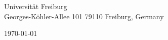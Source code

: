 \begin{minipage}{0.49\textwidth}
\begin{flushleft}
\noindent 
Universität Freiburg\\
Georges-Köhler-Allee 101
79110 Freiburg, Germany
\end{flushleft}
\end{minipage}
\begin{minipage}{0.47\textwidth}
\begin{flushright}
\today
\end{flushright}
\end{minipage} \\

\newcommand{\univ}{Universität Freiburg}
\newcommand{\univshort}{Freiburg}
\newcommand{\degree}{M.Sc.}
\newcommand{\dept}{Computer Science}
